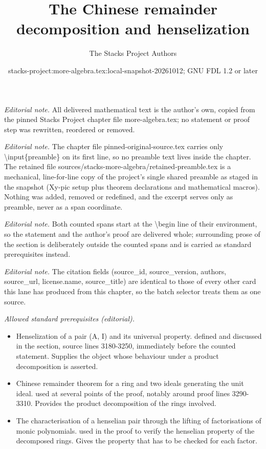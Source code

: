 \documentclass[10pt,a4paper]{amsart}
\title{The Chinese remainder decomposition and henselization}
\author{The Stacks Project Authors}
\date{stacks-project:more-algebra.tex:local-snapshot-20261012; GNU FDL 1.2 or later}
\theoremstyle{plain}
\theoremstyle{definition}
\theoremstyle{remark}
\numberwithin{equation}{subsection}
\begin{document}
\maketitle
\setcounter{subsection}{1}
\noindent\textit{Editorial note.} All delivered mathematical text is the author's own, copied from the pinned Stacks Project chapter file more-algebra.tex; no statement or proof step was rewritten, reordered or removed.\par\medskip
\noindent\textit{Editorial note.} The chapter file pinned-original-source.tex carries only \textbackslash{}input\{preamble\} on its first line, so no preamble text lives inside the chapter. The retained file sources/stacks-more-algebra/retained-preamble.tex is a mechanical, line-for-line copy of the project's single shared preamble as staged in the snapshot (Xy-pic setup plus theorem declarations and mathematical macros). Nothing was added, removed or redefined, and the excerpt serves only as preamble, never as a span coordinate.\par\medskip
\noindent\textit{Editorial note.} Both counted spans start at the \textbackslash{}begin line of their environment, so the statement and the author's proof are delivered whole; surrounding prose of the section is deliberately outside the counted spans and is carried as standard prerequisites instead.\par\medskip
\noindent\textit{Editorial note.} The citation fields (source\_id, source\_version, authors, source\_url, license.name, source\_title) are identical to those of every other card this lane has produced from this chapter, so the batch selector treats them as one source.\par\medskip
\noindent\textit{Allowed standard prerequisites (editorial).}\begin{itemize}
\item Henselization of a pair (A, I) and its universal property. defined and discussed in the section, source lines 3180-3250, immediately before the counted statement. Supplies the object whose behaviour under a product decomposition is asserted.
\item Chinese remainder theorem for a ring and two ideals generating the unit ideal. used at several points of the proof, notably around proof lines 3290-3310. Provides the product decomposition of the rings involved.
\item The characterisation of a henselian pair through the lifting of factorisations of monic polynomials. used in the proof to verify the henselian property of the decomposed rings. Gives the property that has to be checked for each factor.
\end{itemize}\medskip
\end{document}
